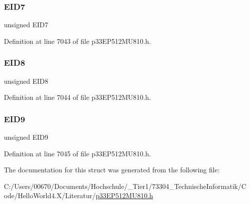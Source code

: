 \subsubsection{\texorpdfstring{E\+I\+D7}{EID7}}
{\footnotesize\ttfamily unsigned E\+I\+D7}



Definition at line 7043 of file p33\+E\+P512\+M\+U810.\+h.

\mbox{\label{structtag_c2_r_x_f14_e_i_d_b_i_t_s_acca25e0b7d86eb499d01f85222baea87}} 
\subsubsection{\texorpdfstring{E\+I\+D8}{EID8}}
{\footnotesize\ttfamily unsigned E\+I\+D8}



Definition at line 7044 of file p33\+E\+P512\+M\+U810.\+h.

\mbox{\label{structtag_c2_r_x_f14_e_i_d_b_i_t_s_ac6748f73d4ada8538b06548be4f396c2}} 
\subsubsection{\texorpdfstring{E\+I\+D9}{EID9}}
{\footnotesize\ttfamily unsigned E\+I\+D9}



Definition at line 7045 of file p33\+E\+P512\+M\+U810.\+h.



The documentation for this struct was generated from the following file\+:\begin{DoxyCompactItemize}
\item 
C\+:/\+Users/00670/\+Documents/\+Hochschule/\+\_\+\+Tier1/73304\+\_\+\+Technische\+Informatik/\+Code/\+Hello\+World4.\+X/\+Literatur/\hyperlink{p33_e_p512_m_u810_8h}{p33\+E\+P512\+M\+U810.\+h}\end{DoxyCompactItemize}
